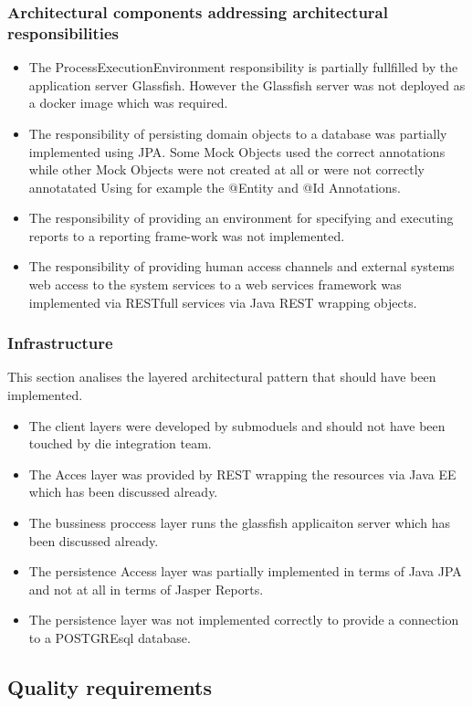 \documentclass[a4paper,10pt]{article}
\begin{document}
\subsubsection{Architectural components addressing architectural responsibilities}
\begin{itemize}
	\item The ProcessExecutionEnvironment responsibility is partially fullfilled by the application server Glassfish. However the Glassfish server was not deployed as a docker image which was required.
	\item The responsibility of persisting domain objects to a database was partially implemented using JPA. Some Mock Objects used the correct annotations
	while other Mock Objects were not created at all or were not correctly annotatated Using for example the @Entity and @Id Annotations.
	\item The responsibility of providing an environment for specifying and executing reports to a reporting frame-work was not implemented.
	\item The responsibility of providing human access channels and external systems web access to the system services to a web services framework was
	implemented via RESTfull services via Java REST wrapping objects.
\end{itemize}

\subsubsection{Infrastructure}
This section analises the layered architectural pattern that should have been implemented.
\begin{itemize}
	\item The client layers were developed by submoduels and should not have been touched by die integration team.
	\item The Acces layer was provided by REST wrapping the resources via Java EE which has been discussed already.
	\item The bussiness proccess layer runs the glassfish applicaiton server which has been discussed already.
	\item The persistence Access layer was partially implemented in terms of Java JPA and not at all in terms of Jasper Reports.
	\item The persistence layer was not implemented correctly to provide a connection to a POSTGREsql database.
\end{itemize}

\subsection{Quality requirements}
\end{document}
